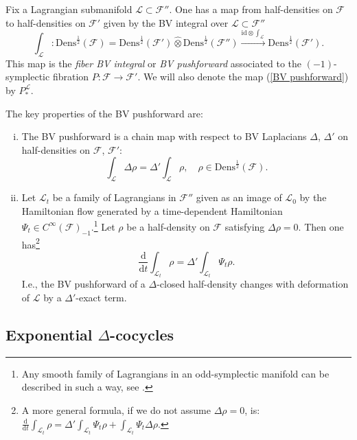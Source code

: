 \documentclass{amsart}
\theoremstyle{plain} %
\theoremstyle{definition}
\theoremstyle{remark}
\newcommand{\mr}{\mathrm}
\newcommand{\ra}{\rightarrow}
\newcommand{\wh}{\widehat}
\newcommand{\F}{\mathcal{F}}
\newcommand{\LL}{\mathcal{L}}
\newcommand{\HD}{\mathrm{Dens}^{\frac12}}
\newcommand{\xra}{\xrightarrow}
\newcommand{\ddd}{\mathrm{d}}
\begin{document}
Fix a Lagrangian submanifold $\LL\subset \F''$. One has a map from half-densities on $\F$ to half-densities on $\F'$ given by the BV integral over $\LL\subset \F''$
\begin{equation}\label{BV pushforward}
    \int_\LL\colon \HD(\F)=\HD(\F')\wh\otimes \HD(\F'')\xra{\mr{id}\otimes \int_\LL} \HD(\F').
\end{equation}
This map is the \emph{fiber BV integral} or \emph{BV pushforward} associated to the $(-1)$-symplectic  fibration $P\colon\F\ra \F'$. We will also denote the map (\ref{BV pushforward}) by $P_*^\LL$.

The key properties of the BV pushforward are:
\begin{enumerate}[(i)]
    \item The BV pushforward is a chain map with respect to BV Laplacians $\Delta$, $\Delta'$ on half-densities on $\F$, $\F'$:
    \begin{equation}\label{BV pushforward chain map property}
        \int_\LL \Delta \rho= \Delta' \int_\LL \rho,\quad \rho\in \HD(\F).
    \end{equation}
    \item Let $\LL_t$ be a family of Lagrangians in $\F''$ 
    given as an image of $\LL_0$ by the Hamiltonian flow generated by a time-dependent Hamiltonian $\Psi_t\in C^\infty(\F)_{-1}$.\footnote{Any smooth family of Lagrangians in an odd-symplectic manifold can be described in such a way, see \cite{Schwarz}.}
    Let $\rho$ be a half-density on $\F$ satisfying $\Delta\rho=0$. Then one has\footnote{
    A more general formula, if we do not assume $\Delta\rho=0$, is:
    $\frac{\ddd}{\ddd t}\int_{\LL_t}\rho = \Delta'\int_{\LL_t} \Psi_t \rho+\int_{\LL_t} \Psi_t \Delta \rho$.
    }
    \begin{equation}\label{BV pushforward L dependence}
        \frac{\ddd}{\ddd t}\int_{\LL_t}\rho = \Delta'\int_{\LL_t} \Psi_t \rho.
    \end{equation}
    I.e., the BV pushforward of a $\Delta$-closed half-density changes with deformation of $\LL$ by a $\Delta'$-exact term.
\end{enumerate}

\subsection{\texorpdfstring{Exponential $\Delta$-cocycles}{Exponential Delta-cocycles}%
}
\label{ss: exponential cocycles}
\end{document}

